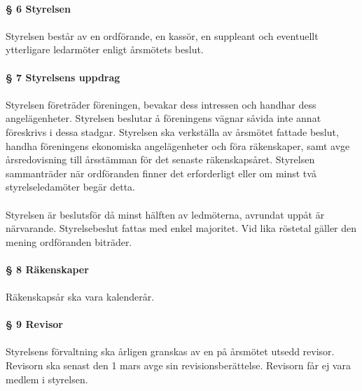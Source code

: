 \documentclass[12pt, a4paper]{article}
\begin{document}
\pagebreak


\paragraph{§ 6 Styrelsen}
\paragraph{}
Styrelsen består av en ordförande, en kassör, en suppleant och eventuellt ytterligare ledarmöter enligt årsmötets beslut.

\paragraph{§ 7 Styrelsens uppdrag}
\paragraph{}
Styrelsen företräder föreningen, bevakar dess intressen och handhar dess angelägenheter. Styrelsen beslutar å föreningens vägnar såvida inte annat
föreskrivs i dessa stadgar. Styrelsen ska verkställa av årsmötet fattade beslut, handha föreningens ekonomiska angelägenheter och föra räkenskaper,
samt avge årsredovisning till årsstämman för det senaste räkenskapsåret. Styrelsen sammanträder när ordföranden finner det erforderligt eller om
minst två styrelseledamöter begär detta.

\paragraph{}
Styrelsen är beslutsför då minst hälften av ledmöterna, avrundat uppåt är närvarande. Styrelsebeslut fattas med enkel majoritet. Vid lika röstetal gäller den mening
ordföranden biträder.

\paragraph{§ 8 Räkenskaper}
\paragraph{}
Räkenskapsår ska vara kalenderår.

\paragraph{§ 9 Revisor}
\paragraph{}
Styrelsens förvaltning ska årligen granskas av en på årsmötet utsedd revisor. Revisorn ska senast den 1 mars avge sin revisionsberättelse. Revisorn får ej vara medlem i styrelsen.
\end{document}
